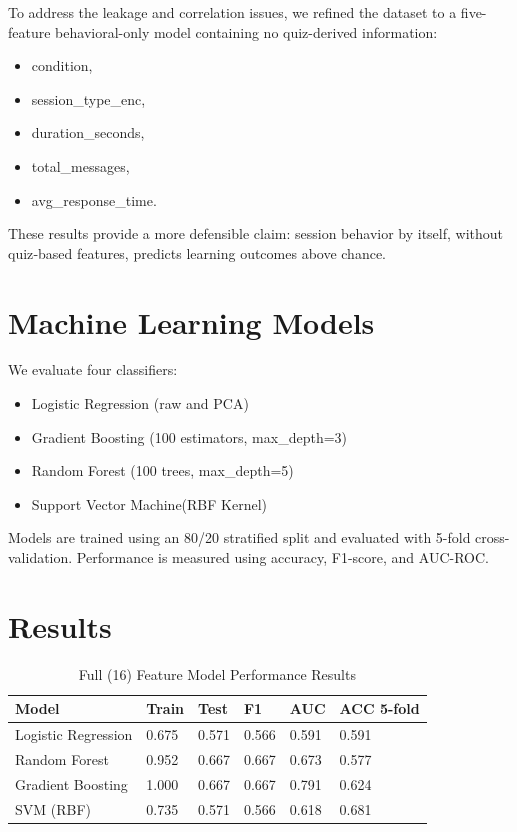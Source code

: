 \documentclass[conference]{IEEEtran}
\begin{document}
To address the leakage and correlation issues, we refined the dataset to a five-feature behavioral-only model containing no quiz-derived information: 

\begin{itemize}[noitemsep]
    \item condition,
    \item session\_type\_enc,
    \item duration\_seconds,
    \item total\_messages,
    \item avg\_response\_time.
\end{itemize}

These results provide a more defensible claim: session behavior by itself, without quiz‑based features, predicts learning outcomes above chance. 


\section{Machine Learning Models}
We evaluate four classifiers: 

\begin{itemize} 
    \item Logistic Regression (raw and PCA)
    \item Gradient Boosting (100 estimators, max\_depth=3)
    \item Random Forest (100 trees, max\_depth=5)
    \item Support Vector Machine(RBF Kernel)
\end{itemize}

Models are trained using an 80/20 stratified split and evaluated with 5-fold cross-validation. Performance is measured using accuracy, F1-score, and AUC-ROC.

\section{Results}

\begin{table}[H]
\centering
\caption{Full (16) Feature Model Performance Results}
\begin{tabular}{|p{2.2cm}|p{1cm}|p{1cm}|p{1cm}|p{1cm}|p{1.2cm}|}
\hline
\textbf{Model} & \textbf{Train} & \textbf{Test} & \textbf{F1} & \textbf{AUC} & \textbf{ACC 5-fold}\\
\hline
Logistic Regression  & 0.675 & 0.571  & 0.566  & 0.591 & 0.591 \\
\hline
Random Forest & 0.952 & 0.667  & 0.667 & 0.673 &  0.577 \\
\hline
Gradient Boosting & 1.000 & 0.667  & 0.667 & 0.791 &  0.624 \\
\hline
SVM (RBF) & 0.735 & 0.571  & 0.566 & 0.618 &  0.681 \\
\hline
\end{tabular}
\label{tab:16-performance-chart}
\end{table}
\end{document}
